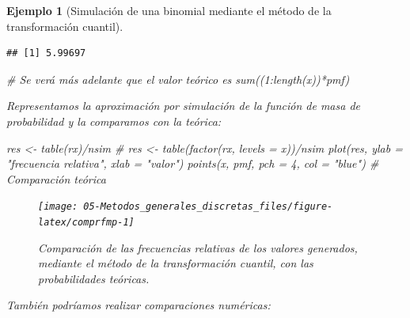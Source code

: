 \documentclass[
]{book}
\newenvironment{Shaded}{\begin{snugshade}}{\end{snugshade}}
\newcommand{\AttributeTok}[1]{\textcolor[rgb]{0.77,0.63,0.00}{#1}}
\newcommand{\CommentTok}[1]{\textcolor[rgb]{0.56,0.35,0.01}{\textit{#1}}}
\newcommand{\DecValTok}[1]{\textcolor[rgb]{0.00,0.00,0.81}{#1}}
\newcommand{\FunctionTok}[1]{\textcolor[rgb]{0.00,0.00,0.00}{#1}}
\newcommand{\NormalTok}[1]{#1}
\newcommand{\OtherTok}[1]{\textcolor[rgb]{0.56,0.35,0.01}{#1}}
\newcommand{\SpecialCharTok}[1]{\textcolor[rgb]{0.00,0.00,0.00}{#1}}
\newcommand{\StringTok}[1]{\textcolor[rgb]{0.31,0.60,0.02}{#1}}
\theoremstyle{break}
\newtheorem{example}{Ejemplo}[chapter]
\theoremstyle{nonumberplain}
\begin{document}
\begin{example}[Simulación de una binomial mediante el método de la transformación cuantil]
\begin{verbatim}
## [1] 5.99697
\end{verbatim}

\begin{Shaded}
\begin{Highlighting}[]
\CommentTok{\# Se verá más adelante que el valor teórico es sum((1:length(x))*pmf)}
\end{Highlighting}
\end{Shaded}

Representamos la aproximación por simulación de la función de masa de probabilidad y la comparamos con la teórica:

\begin{Shaded}
\begin{Highlighting}[]
\NormalTok{res }\OtherTok{\textless{}{-}} \FunctionTok{table}\NormalTok{(rx)}\SpecialCharTok{/}\NormalTok{nsim}
\CommentTok{\# res \textless{}{-} table(factor(rx, levels = x))/nsim}
\FunctionTok{plot}\NormalTok{(res, }\AttributeTok{ylab =} \StringTok{"frecuencia relativa"}\NormalTok{, }\AttributeTok{xlab =} \StringTok{"valor"}\NormalTok{)}
\FunctionTok{points}\NormalTok{(x, pmf, }\AttributeTok{pch =} \DecValTok{4}\NormalTok{, }\AttributeTok{col =} \StringTok{"blue"}\NormalTok{)  }\CommentTok{\# Comparación teórica}
\end{Highlighting}
\end{Shaded}

\begin{figure}[!htb]

{\centering \texttt{[image: 05-Metodos\_generales\_discretas\_files/figure-latex/comprfmp-1]} 

}

\caption{Comparación de las frecuencias relativas de los valores generados, mediante el método de la transformación cuantil, con las probabilidades teóricas.}\label{fig:comprfmp}
\end{figure}

También podríamos realizar comparaciones numéricas:

\begin{Shaded}
\end{Shaded}


\end{example}
\end{document}
